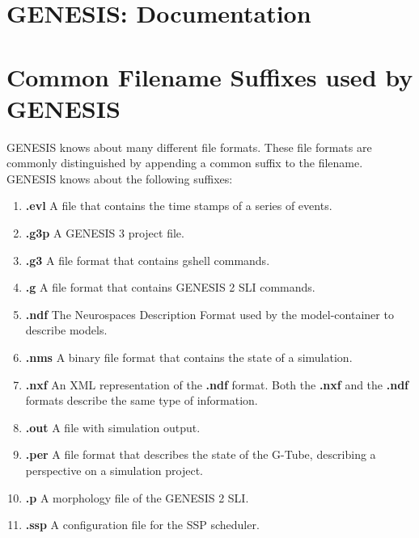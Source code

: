 \documentclass[12pt]{article}
\begin{document}
\section*{GENESIS: Documentation}

\section*{Common Filename Suffixes used by GENESIS}

GENESIS knows about many different file formats.  These file formats
are commonly distinguished by appending a common suffix to the
filename.  GENESIS knows about the following suffixes:

\begin{enumerate}

\item {\bf .evl} A file that contains the time stamps of a series of events.
\item {\bf .g3p} A GENESIS 3 project file.
\item {\bf .g3} A file format that contains gshell commands.
\item {\bf .g} A file format that contains GENESIS 2 SLI commands.
\item {\bf .ndf} The Neurospaces Description Format used by the model-container to describe models.
\item {\bf .nms} A binary file format that contains the state of a simulation.
\item {\bf .nxf} An XML representation of the {\bf .ndf} format.  Both the {\bf .nxf} and the {\bf .ndf} formats describe the same type of information.
\item {\bf .out} A file with simulation output.
\item {\bf .per} A file format that describes the state of the G-Tube, describing a perspective on a simulation project.
\item {\bf .p} A morphology file of the GENESIS 2 SLI.
\item {\bf .ssp} A configuration file for the SSP scheduler.

\end{enumerate}
\end{document}

